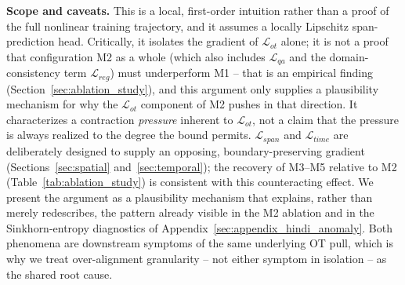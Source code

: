 \documentclass[11pt]{article}
\begin{document}
\textbf{Scope and caveats.} This is a local, first-order intuition rather than a proof of the full nonlinear training trajectory, and it assumes a locally Lipschitz span-prediction head. Critically, it isolates the gradient of $\mathcal{L}_{ot}$ alone; it is not a proof that configuration M2 as a whole (which also includes $\mathcal{L}_{qa}$ and the domain-consistency term $\mathcal{L}_{reg}$) must underperform M1 -- that is an empirical finding (Section~\ref{sec:ablation_study}), and this argument only supplies a plausibility mechanism for why the $\mathcal{L}_{ot}$ component of M2 pushes in that direction. It characterizes a contraction \emph{pressure} inherent to $\mathcal{L}_{ot}$, not a claim that the pressure is always realized to the degree the bound permits. $\mathcal{L}_{span}$ and $\mathcal{L}_{time}$ are deliberately designed to supply an opposing, boundary-preserving gradient (Sections~\ref{sec:spatial} and~\ref{sec:temporal}); the recovery of M3--M5 relative to M2 (Table~\ref{tab:ablation_study}) is consistent with this counteracting effect. We present the argument as a plausibility mechanism that explains, rather than merely redescribes, the pattern already visible in the M2 ablation and in the Sinkhorn-entropy diagnostics of Appendix~\ref{sec:appendix_hindi_anomaly}. Both phenomena are downstream symptoms of the same underlying OT pull, which is why we treat over-alignment granularity -- not either symptom in isolation -- as the shared root cause.
\end{document}
